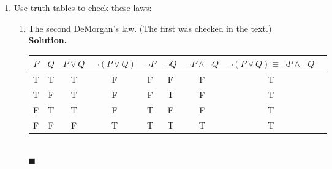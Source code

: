 \documentclass{report}
\newcommand{\sol}{\vspace{1em}\\\textbf{Solution.}\vspace{0.5em}}
\newcommand{\qed}{‎\\‎\hfill$\blacksquare$\vspace{1em}}
\begin{document}
\begin{enumerate}[leftmargin=*]
    \item Use truth tables to check these laws:
          \begin{enumerate}
              \item The second DeMorgan's law. (The first was checked in the text.) \sol{}
                    \begin{center}
                        \begin{tabular}{ccccccccc}
                            $P$ & $Q$ & $P \vee Q$ & $\neg(P \vee Q)$ & $\neg P$ & $\neg Q$ & $\neg P \wedge \neg Q$ & $\neg(P \vee Q) \equiv \neg P \wedge \neg Q$ \\
                            \hline
                            T   & T   & T          & F                & F        & F        & F                      & T                                            \\
                            T   & F   & T          & F                & F        & T        & F                      & T                                            \\
                            F   & T   & T          & F                & T        & F        & F                      & T                                            \\
                            F   & F   & F          & T                & T        & T        & T                      & T
                        \end{tabular}
                    \end{center} \qed


\end{enumerate}
\end{enumerate}
\end{document}
